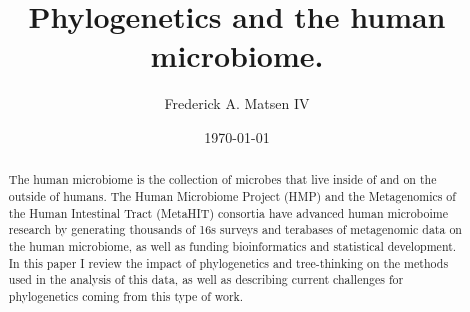\documentclass{amsart}
\newcommand{\forarxiv}[1]{#1}
\newcommand{\notforarxiv}[1]{}
\begin{document}
\notforarxiv{
\begin{flushright}
Version dated: \today
\end{flushright}
\bigskip
\noindent RH: PHYLOGENETICS AND THE HUMAN MICROBIOME
\bigskip
\medskip
\begin{center}

\noindent{\Large \bf Phylogenetics and the human microbiome.}
\bigskip

\noindent {\normalsize \sc
Frederick A. Matsen IV$^1$}\\
\noindent {\small \it
$^1$
Program in Computational Biology, Fred Hutchinson Cancer Research Center, Seattle, WA, 91802, USA}\\
\end{center}
\medskip
\noindent{\bf Corresponding author:} Frederick A Matsen, Program in Computational Biology, Fred Hutchinson Cancer Research Center, Seattle, WA, 91802, USA; E-mail: matsen@fhcrc.org.\\
\vspace{1in}
}

\forarxiv{\
\title{Phylogenetics and the human microbiome.}
\author{Frederick A. Matsen IV}
\date{\today}
\begin{abstract}
}
\notforarxiv{
\subsubsection{Abstract}
}

The human microbiome is the collection of microbes that live inside of and on the outside of humans.
The Human Microbiome Project (HMP) and the Metagenomics of the Human Intestinal Tract (MetaHIT) consortia have advanced human microboime research by generating thousands of 16s surveys and terabases of metagenomic data on the human microbiome, as well as funding bioinformatics and statistical development.
In this paper I review the impact of phylogenetics and tree-thinking on the methods used in the analysis of this data, as well as describing current challenges for phylogenetics coming from this type of work.

\forarxiv{
\end{abstract}
\maketitle
}

\notforarxiv{
\noindent (Keywords: human microbiome; microbial ecology; phylogenetic methods; review)\\
\vspace{1.5in}
}
\end{document}
